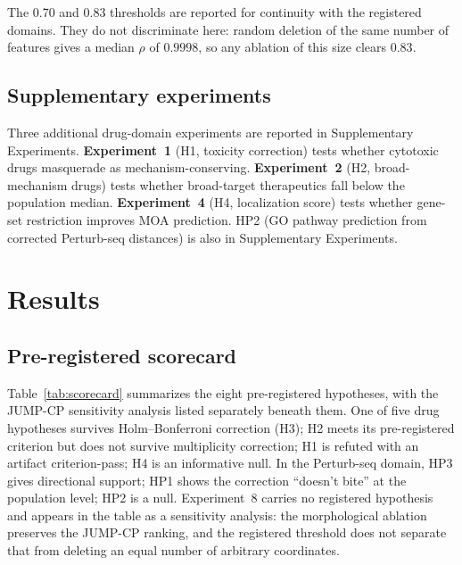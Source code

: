 \documentclass[11pt]{article}
\begin{document}
The 0.70 and 0.83 thresholds are reported for continuity with the registered
domains. They do not discriminate here: random deletion of the same number of
features gives a median $\rho$ of $0.9998$, so any ablation of this size
clears $0.83$.

\subsection{Supplementary experiments}

Three additional drug-domain experiments are reported in Supplementary
Experiments. \textbf{Experiment~1}
(H1, toxicity correction) tests whether cytotoxic drugs masquerade as
mechanism-conserving. \textbf{Experiment~2} (H2, broad-mechanism drugs)
tests whether broad-target therapeutics fall below the population median.
\textbf{Experiment~4} (H4, localization score) tests whether gene-set
restriction improves MOA prediction. HP2 (GO pathway prediction from
corrected Perturb-seq distances) is also in Supplementary Experiments.

\section{Results}

\subsection{Pre-registered scorecard}

Table~\ref{tab:scorecard} summarizes the eight pre-registered hypotheses,
with the JUMP-CP sensitivity analysis listed separately beneath them.
One of five drug hypotheses survives Holm--Bonferroni correction (H3);
H2 meets its pre-registered criterion but does not survive multiplicity
correction; H1 is refuted with an artifact criterion-pass; H4 is an
informative null.
In the Perturb-seq domain, HP3 gives directional support; HP1 shows the correction
``doesn't bite'' at the population level; HP2 is a null. Experiment~8 carries
no registered hypothesis and appears in the table as a sensitivity analysis:
the morphological ablation preserves the JUMP-CP ranking, and the registered
threshold does not separate that from deleting an equal number of arbitrary
coordinates.
\end{document}
